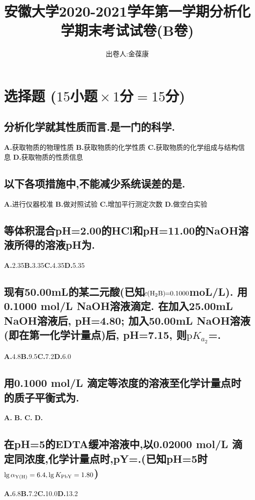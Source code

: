\documentclass[UTF8]{article}
\title{安徽大学2020-2021学年第一学期分析化学期末考试试卷(B卷)}
\author{出卷人:金葆康}
\date{}
\newcommand{\ptsMulti}[3]{ \small($#1\!\!$小题$\!\!\times #2\!\!$分$\!\!=\!\!#3\!\!$分)}
\newcommand{\p}{\mathrm{p}}
\newcommand{\shortline}{\underline{\hspace{1cm}}}
\newcommand{\bfA}{\textbf{A.}}
\newcommand{\bfB}{\qquad \textbf{B.}}
\newcommand{\bfC}{\qquad \textbf{C.}}
\newcommand{\bfD}{\qquad \textbf{D.}}
\newcommand{\ind}{\hspace{-1pt}}
\newcommand{\indLarge}{\hspace{-0.6cm}}
\begin{document}
    \maketitle
    \section{\Large{\textbf{选择题}}\ptsMulti{15}{1}{15}}
    \subsection{分析化学就其性质而言.是一门\shortline\ind 的科学.}
        \indLarge \bfA 获取物质的物理性质
        \indLarge \bfB 获取物质的化学性质
        \indLarge \bfC 获取物质的化学组成与结构信息
        \indLarge \bfD 获取物质的性质信息
    
    \subsection{以下各项措施中,不能减少系统误差的是\shortline.}
        \bfA 进行仪器校准 \bfB 做对照试验 \bfC 增加平行测定次数 \bfD 做空白实验

    \subsection{等体积混合pH=2.00的HCl和pH=11.00的NaOH溶液所得的溶液pH为\shortline.}
    \bfA 2.35\bfB 3.35\bfC 4.35\bfD 5.35

    \subsection{现有50.00mL的某二元酸(已知$\!c(\ce{H2B})\!\!=\!\!0.1000$moL/L). 用\ind 0.1000 mol/L NaOH\ind 溶液滴定. 在加入25.00mL NaOH溶液后, pH=4.80; 加入\ind 50.00mL NaOH溶液\ind (即在第一化学计量点)\ind 后, pH=7.15, 则$\p K_{a_2}$=\shortline.}
    \bfA 4.8\bfB 9.5\bfC 7.2\bfD 6.0

    \subsection{用0.1000 mol/L 滴定等浓度的溶液至化学计量点时的质子平衡式为\shortline.}
    \indLarge \bfA \ce{[H+] = [OH-] + [NH3]}
    \indLarge \bfB \ce{[NH4^+] + [H+] = [OH-]}
    \indLarge \bfC \ce{[H+] = [OH-] + [Cl-]}
    \indLarge \bfD \ce{[H+] + [NH4^+] = [OH-] + [Cl-]}

    \subsection{在pH=5的EDTA缓冲溶液中,以0.02000 mol/L 滴定同浓度,化学计量点时,pY=\shortline.(已知pH=5时$\lg \alpha_{\ce{Y(H)}}=6.4, \lg K_{\ce{PbY}}=1.80$)}
    \bfA 6.8\bfB 7.2\bfC 10.0\bfD 13.2
\end{document}
